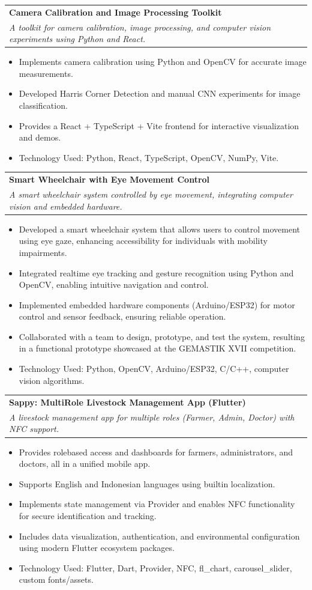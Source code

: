 \documentclass[a4paper,11pt]{article}
\makeatletter
\newcommand{\resumeProject}[4]{
\vspace{0.5mm}\item
    \begin{tabular*}{0.98\textwidth}[t]{l@{\extracolsep{\fill}}r}
        \textbf{#1} & \textit{\footnotesize{#3}} \\
        \footnotesize{\textit{#2}} & \footnotesize{#4}
    \end{tabular*}
    \vspace{-2.4mm}
    \par
}
\newcommand{\resumeItemListStart}{\begin{justify}\begin{itemize}[leftmargin=3ex, rightmargin=2ex, noitemsep,labelsep=1.2mm,itemsep=0mm]\small}
\newcommand{\resumeItemListEnd}{\end{itemize}\end{justify}\vspace{-2mm}}
\makeatother
\begin{document}
\resumeProject
{Camera Calibration and Image Processing Toolkit}
{A toolkit for camera calibration, image processing, and computer vision experiments using Python and React.}
{}
{}
\resumeItemListStart
\item {Implements camera calibration using Python and OpenCV for accurate image measurements.}
\item {Developed Harris Corner Detection and manual CNN experiments for image classification.}
\item {Provides a React + TypeScript + Vite frontend for interactive visualization and demos.}
\item {Technology Used: Python, React, TypeScript, OpenCV, NumPy, Vite.}
\resumeItemListEnd
\vspace{-2mm}

\resumeProject
{Smart Wheelchair with Eye Movement Control} %
{A smart wheelchair system controlled by eye movement, integrating computer vision and embedded hardware.} %
{} %
{}
\resumeItemListStart
\item {Developed a smart wheelchair system that allows users to control movement using eye gaze, enhancing accessibility for individuals with mobility impairments.}
\item {Integrated real\-time eye tracking and gesture recognition using Python and OpenCV, enabling intuitive navigation and control.}
\item {Implemented embedded hardware components (Arduino/ESP32) for motor control and sensor feedback, ensuring reliable operation.}
\item {Collaborated with a team to design, prototype, and test the system, resulting in a functional prototype showcased at the GEMASTIK XVII competition.}
\item {Technology Used: Python, OpenCV, Arduino/ESP32, C/C++, computer vision algorithms.}
\resumeItemListEnd
\vspace{-2mm}

\resumeProject
{Sappy: Multi\-Role Livestock Management App (Flutter)} %
{A livestock management app for multiple roles (Farmer, Admin, Doctor) with NFC support.}
{} %
{}
\resumeItemListStart
\item {Provides role\-based access and dashboards for farmers, administrators, and doctors, all in a unified mobile app.}
\item {Supports English and Indonesian languages using built\-in localization.}
\item {Implements state management via Provider and enables NFC functionality for secure identification and tracking.}
\item {Includes data visualization, authentication, and environmental configuration using modern Flutter ecosystem packages.}
\item {Technology Used: Flutter, Dart, Provider, NFC, fl\_chart, carousel\_slider, custom fonts/assets.}
\resumeItemListEnd
\vspace{-2mm}
\end{document}
